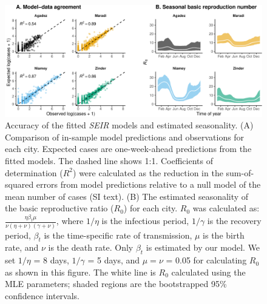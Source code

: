 \documentclass[3p]{elsarticle} %
\makeatletter
\def\maxwidth{\ifdim\Gin@nat@width>\linewidth\linewidth
\else\Gin@nat@width\fi}
\let\Oldincludegraphics\includegraphics
\renewcommand{\includegraphics}[1]{\Oldincludegraphics[width=\maxwidth]{#1}}
\makeatother
\begin{document}
\begin{figure}
\centering
\includegraphics{ms2_files/figure-latex/scatters-r0-1.pdf}
\caption{Accuracy of the fitted \emph{SEIR} models and estimated
seasonality. (A) Comparison of in-sample model predictions and
observations for each city. Expected cases are one-week-ahead
predictions from the fitted models. The dashed line shows 1:1.
Coefficients of determination (\(R^2\)) were calculated as the reduction
in the sum-of-squared errors from model predictions relative to a null
model of the mean number of cases (SI text). (B) The estimated
seasonality of the basic reproductive ratio (\(R_0\)) for each city.
\(R_0\) was calculated as:
\(\frac{\eta \beta_t \mu}{\nu(\eta+\nu)(\gamma+\nu)}\), where \(1/\eta\)
is the infectious period, \(1/\gamma\) is the recovery period,
\(\beta_t\) is the time-specific rate of transmission, \(\mu\) is the
birth rate, and \(\nu\) is the death rate. Only \(\beta_t\) is estimated
by our model. We set \(1/\eta\) = 8 days, \(1/\gamma\) = 5 days, and
\(\mu = \nu\) = 0.05 for calculating \(R_0\) as shown in this figure.
The white line is \(R_0\) calculated using the MLE parameters; shaded
regions are the bootstrapped 95\% confidence intervals.
\label{scatters}}
\end{figure}
\end{document}
